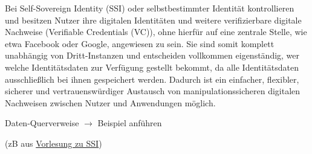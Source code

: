 \vspace{0.3cm}


\begin{Solution}

Bei Self-Sovereign Identity (SSI) oder selbstbestimmter Identität kontrollieren und besitzen Nutzer ihre digitalen Identitäten und weitere verifizierbare digitale Nachweise (Verifiable Credentials (VC)), ohne hierfür auf eine zentrale Stelle, wie etwa Facebook oder Google, angewiesen zu sein. Sie sind somit komplett unabhängig von Dritt-Instanzen und entscheiden vollkommen eigenständig, wer welche Identitätsdaten zur Verfügung gestellt bekommt, da alle Identitätsdaten ausschließlich bei ihnen gespeichert werden. Dadurch ist ein einfacher, flexibler, sicherer und vertrauenswürdiger Austausch von manipulationssicheren digitalen Nachweisen zwischen Nutzer und Anwendungen möglich.

\end{Solution}

\vspace{0.3cm}


\begin{Solution}

Daten-Querverweise $\rightarrow$ Beispiel anführen 

(zB aus \href{https://norbert-pohlmann.com/glossar-cyber-sicherheit/self-sovereign-identity-ssi/}{Vorlesung zu SSI})

\end{Solution}

\vspace{0.5cm}